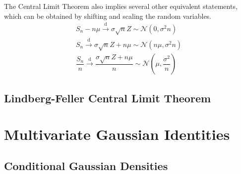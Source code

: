 \documentclass[11pt]{report} %
\begin{document}
The Central Limit Theorem also implies several other equivalent statements, which can be obtained by shifting and scaling the random variables.
\begin{gather}
S_{n} - n\mu \overset{\mathrm{d}}{\to} \sigma\sqrt{n}Z \sim \mathcal{N}\left(0, \sigma^{2}n\right) \\
S_{n} \overset{\mathrm{d}}{\to} \sigma\sqrt{n}Z + n\mu \sim \mathcal{N}\left(n\mu, \sigma^{2}n\right) \\
\dfrac{S_{n}}{n} \overset{\mathrm{d}}{\to} \dfrac{\sigma\sqrt{n}Z + n\mu}{n}\sim \mathcal{N}\left(\mu, \dfrac{\sigma^{2}}{n}\right)
\end{gather}

\subsection{Lindberg-Feller Central Limit Theorem}

\section{Multivariate Gaussian Identities}

\subsection{Conditional Gaussian Densities}
\end{document}
